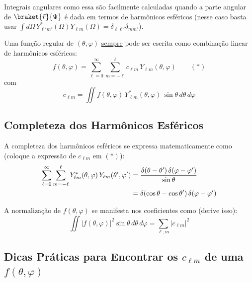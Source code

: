 Integrais angulares como essa são facilmente calculadas quando a parte angular de $\braket{\vec{r}}{\Psi}$ é dada em termos de harmônicos esféricos (nesse caso basta usar $\int d\Omega \, Y_{\ell'm'}^*(\Omega)Y_{\ell m}(\Omega) = \delta_{\ell\ell'}\delta_{mm'}$).

Uma função regular de $(\theta,\varphi)$ \underline{sempre} pode ser escrita como combinação linear de harmônicos esféricos:
\begin{equation}
    f(\theta,\varphi) = \sum_{\ell=0}^{\infty}\sum_{m=-\ell}^{\ell} c_{\ell m}\,Y_{\ell m}(\theta,\varphi) \qquad (*)
\label{eq:aula22_expansao_harmonicos}
\end{equation}
com
\begin{equation}
    c_{\ell m} = \iint f(\theta,\varphi)\,Y_{\ell m}^*(\theta,\varphi)\,\sin\theta \, d\theta \, d\varphi
\label{eq:aula22_coef_clm}
\end{equation}

\subsection*{Completeza dos Harmônicos Esféricos}

A completeza dos harmônicos esféricos se expressa matematicamente como (coloque a expressão de $c_{\ell m}$ em $(*)$):
\begin{align}
    \sum_{\ell=0}^{\infty}\sum_{m=-\ell}^{\ell} Y_{\ell m}^*(\theta,\varphi)\,Y_{\ell m}(\theta',\varphi') &= \frac{\delta(\theta-\theta')\,\delta(\varphi-\varphi')}{\sin\theta} \notag \\
    &= \delta(\cos\theta-\cos\theta')\,\delta(\varphi-\varphi')
\label{eq:aula22_completeza_harmonicos}
\end{align}

A normalização de $f(\theta,\varphi)$ se manifesta nos coeficientes como (derive isso):
\begin{equation}
    \iint |f(\theta,\varphi)|^2 \sin\theta \, d\theta \, d\varphi = \sum_{\ell,m} |c_{\ell m}|^2
\label{eq:aula22_normalizacao_coef}
\end{equation}

\subsection*{Dicas Práticas para Encontrar os $c_{\ell m}$ de uma $f(\theta,\varphi)$}

